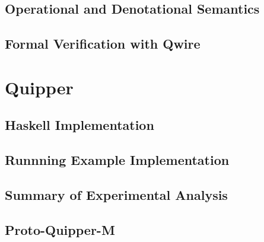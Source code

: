 \documentclass[acmsmall,screen,review]{acmart}
\begin{document}
\subsection{Operational and Denotational Semantics}
\subsection{Formal Verification with Qwire}
\section{Quipper}
\subsection{Haskell Implementation}
\subsection{Runnning Example Implementation}
\subsection{Summary of Experimental Analysis}
\subsection{Proto-Quipper-M}
\end{document}
